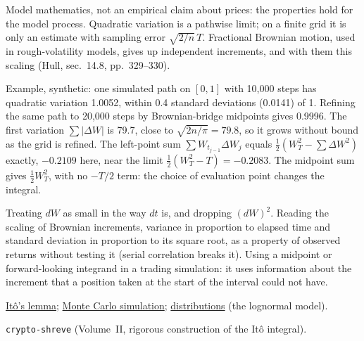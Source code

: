 \begin{qfdefinition}[Brownian motion and quadratic variation: independent Gaussian increments, quadratic variation equal to elapsed time, and why $(dW)^2=dt$ produces It\^o's correction]
 Model mathematics, not an empirical claim about prices: the properties hold for the model process. Quadratic variation is a pathwise limit; on a finite grid it is only an estimate with sampling error $\sqrt{2/n}\,T$. Fractional Brownian motion, used in rough-volatility models, gives up independent increments, and with them this scaling (Hull, sec.~14.8, pp.~329--330).

 Example, synthetic: one simulated path on $[0,1]$ with 10{,}000 steps has quadratic variation 1.0052, within 0.4 standard deviations (0.0141) of 1. Refining the same path to 20{,}000 steps by Brownian-bridge midpoints gives 0.9996. The first variation $\sum|\Delta W|$ is 79.7, close to $\sqrt{2n/\pi}=79.8$, so it grows without bound as the grid is refined. The left-point sum $\sum W_{t_{j-1}}\Delta W_j$ equals $\tfrac12(W_T^2-\sum\Delta W^2)$ exactly, $-0.2109$ here, near the limit $\tfrac12(W_T^2-T)=-0.2083$. The midpoint sum gives $\tfrac12W_T^2$, with no $-T/2$ term: the choice of evaluation point changes the integral.

 Treating $dW$ as small in the way $dt$ is, and dropping $(dW)^2$. Reading the scaling of Brownian increments, variance in proportion to elapsed time and standard deviation in proportion to its square root, as a property of observed returns without testing it (serial correlation breaks it). Using a midpoint or forward-looking integrand in a trading simulation: it uses information about the increment that a position taken at the start of the interval could not have.

 \hyperref[res:ito-lemma-geometric-brownian-motion]{It\^o's lemma}; \hyperref[meth:monte-carlo-simulation]{Monte Carlo simulation}; \hyperref[def:financial-distributions]{distributions} (the lognormal model).

 \nolinkurl{crypto-shreve} (Volume~II, rigorous construction of the It\^o integral).

\end{qfdefinition}

